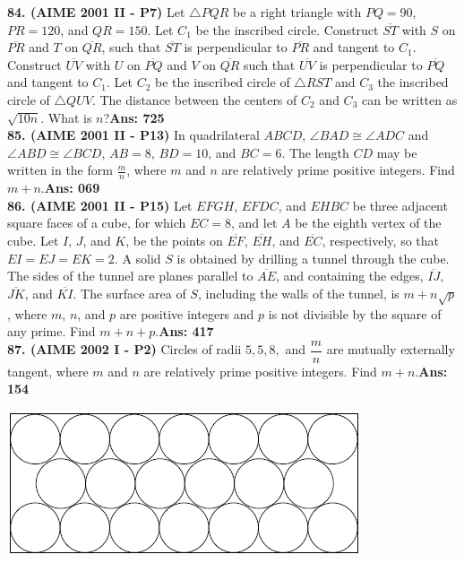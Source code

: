 \documentclass[letterpaper,10pt,addpoints]{exam}
\begin{document}
\textbf{84. (AIME 2001 II - P7) }Let $\triangle{PQR}$ be a right triangle with $PQ = 90$, $PR = 120$, and $QR = 150$. Let $C_{1}$ be the inscribed circle. Construct $\overline{ST}$ with $S$ on $\overline{PR}$ and $T$ on $\overline{QR}$, such that $\overline{ST}$ is perpendicular to $\overline{PR}$ and tangent to $C_{1}$. Construct $\overline{UV}$ with $U$ on $\overline{PQ}$ and $V$ on $\overline{QR}$ such that $\overline{UV}$ is perpendicular to $\overline{PQ}$ and tangent to $C_{1}$. Let $C_{2}$ be the inscribed circle of $\triangle{RST}$ and $C_{3}$ the inscribed circle of $\triangle{QUV}$. The distance between the centers of $C_{2}$ and $C_{3}$ can be written as $\sqrt {10n}$. What is $n$?\quad\textbf{Ans: 725}\\

\textbf{85. (AIME 2001 II - P13) }In quadrilateral $ABCD$, $\angle{BAD}\cong\angle{ADC}$ and $\angle{ABD}\cong\angle{BCD}$, $AB = 8$, $BD = 10$, and $BC = 6$. The length $CD$ may be written in the form $\frac {m}{n}$, where $m$ and $n$ are relatively prime positive integers. Find $m + n$.\quad\textbf{Ans: 069}\\

\textbf{86. (AIME 2001 II - P15) }Let $EFGH$, $EFDC$, and $EHBC$ be three adjacent square faces of a cube, for which $EC = 8$, and let $A$ be the eighth vertex of the cube. Let $I$, $J$, and $K$, be the points on $\overline{EF}$, $\overline{EH}$, and $\overline{EC}$, respectively, so that $EI = EJ = EK = 2$. A solid $S$ is obtained by drilling a tunnel through the cube. The sides of the tunnel are planes parallel to $\overline{AE}$, and containing the edges, $\overline{IJ}$, $\overline{JK}$, and $\overline{KI}$. The surface area of $S$, including the walls of the tunnel, is $m + n\sqrt {p}$, where $m$, $n$, and $p$ are positive integers and $p$ is not divisible by the square of any prime. Find $m + n + p$.\quad\textbf{Ans: 417}\\

\textbf{87. (AIME 2002 I - P2) }Circles of radii $5, 5, 8,$ and $\dfrac{m}{n}$ are mutually externally tangent, where $m$ and $n$ are relatively prime positive integers. Find $m + n.$\quad\textbf{Ans: 154}

\begin{center}
\includegraphics[scale=0.6]{AIME_2002I_Problem_02.png}
\end{center}
\end{document}
